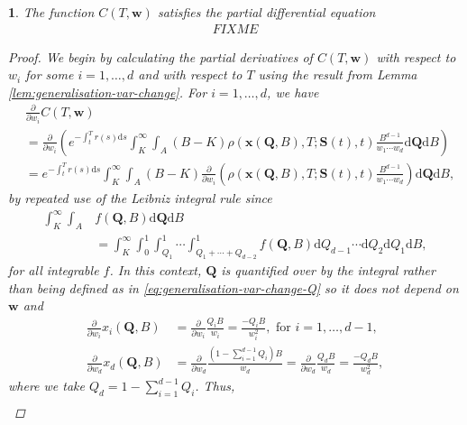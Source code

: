 \documentclass[english]{article}
\numberwithin{equation}{section}
\numberwithin{figure}{section}
\theoremstyle{bolddescit}
\newtheorem{theorem}{\protect\theoremname}[section]
\theoremstyle{definition}
\theoremstyle{definition}
\theoremstyle{plain}
\theoremstyle{plain}
\theoremstyle{bolddesc}
\theoremstyle{plain}
\theoremstyle{remark}
\providecommand{\theoremname}{Theorem}
\begin{document}
\begin{theorem}
  The function $C(T,\mathbf{w})$ satisfies the partial differential equation
  \begin{align*}
    FIXME
  \end{align*}

  \begin{proof}
    We begin by calculating the partial derivatives of $C(T,\mathbf{w})$ with respect to $w_i$ for some $i=1,\ldots,d$ and with respect to $T$ using the result from Lemma \ref{lem:generalisation-var-change}. For $i=1,\ldots,d$, we have
    \begin{align*}
      &\frac{\partial}{\partial w_i} C(T,\mathbf{w})\\
      &= \frac{\partial}{\partial w_i} \left(e^{-\int_t^T r(s) \mathrm{d}s} \int_K^\infty \int_A \left(B - K\right) \rho(\mathbf{x}(\mathbf{Q},B),T;\mathbf{S}(t),t) \frac{B^{d-1}}{w_1 \cdots w_d} \mathrm{d}\mathbf{Q} \mathrm{d}B\right)\\
      &= e^{-\int_t^T r(s) \mathrm{d}s}\int_K^\infty \int_A \left(B - K\right) \frac{\partial}{\partial w_i} \left(\rho(\mathbf{x}(\mathbf{Q},B),T;\mathbf{S}(t),t) \frac{B^{d-1}}{w_1 \cdots w_d}\right) \mathrm{d}\mathbf{Q} \mathrm{d}B,
    \end{align*}
    by repeated use of the Leibniz integral rule since
    \begin{align*}
      \int_K^\infty \int_A & f(\mathbf{Q},B) \mathrm{d}\mathbf{Q} \mathrm{d}B \\
      &= \int_K^\infty \int_0^1 \int_{Q_1}^1 \cdots \int_{Q_1 + \cdots + Q_{d-2}}^1 f(\mathbf{Q},B) \mathrm{d}Q_{d-1} \cdots \mathrm{d}Q_2 \mathrm{d}Q_1 \mathrm{d}B,
    \end{align*}
    for all integrable $f$. In this context, $\mathbf{Q}$ is quantified over by the integral rather than being defined as in \eqref{eq:generalisation-var-change-Q} so it does not depend on $\mathbf{w}$ and
    \begin{align*}
      \frac{\partial}{\partial w_i} x_i(\mathbf{Q},B)
      &= \frac{\partial}{\partial w_i} \frac{Q_i B}{w_i}
      = \frac{- Q_i B}{w_i^2}, \text{ for } i=1,\ldots,d-1,\\
      \frac{\partial}{\partial w_d} x_d(\mathbf{Q},B)
      &= \frac{\partial}{\partial w_d} \frac{(1 - \sum_{i=1}^{d-1} Q_i) B}{w_d}
      = \frac{\partial}{\partial w_d} \frac{Q_d B}{w_d}
      = \frac{- Q_d B}{w_d^2},
    \end{align*}
    where we take $Q_d = 1 - \sum_{i=1}^{d-1} Q_i$. Thus,
    \begin{align*}

\end{align*}
\end{proof}
\end{theorem}
\end{document}
